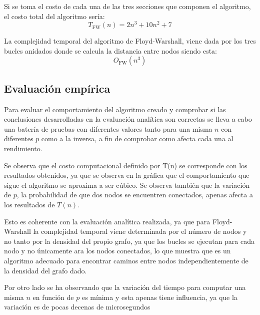Si se toma el costo de cada una de las tres secciones que componen el algoritmo, el costo total del algoritmo sería:
\begin{equation}
    T_{\mathrm{FW}}(n) = 2n^3 + 10n^2 + 7
\end{equation}

La complejidad temporal del algoritmo de Floyd-Warshall, viene dada por los tres bucles anidados donde se calcula la distancia entre nodos  siendo esta:
\begin{equation}
    O_{\mathrm{FW}}(n^3) 
\end{equation}

\subsection*{Evaluación empírica}

Para evaluar el comportamiento del algoritmo creado y comprobar si las conclusiones desarrolladas en la evaluación analítica son correctas se lleva a cabo una batería de pruebas con diferentes valores tanto para una misma $n$ con diferentes $p$ como a la inversa, a fin de comprobar como afecta cada una al rendimiento.


Se observa que el costo computacional definido por T(n) se corresponde con los resultados obtenidos, ya que se observa en la gráfica que el comportamiento que sigue el algoritmo se aproxima a ser cúbico. Se observa también que la variación de $p$, la probabilidad de que dos nodos se encuentren conectados, apenas  afecta a los resultados de $T(n)$.

Esto es coherente con la evaluación analítica realizada, ya que para Floyd-Warshall la complejidad temporal viene determinada por el número de nodos y no tanto por la densidad del propio grafo, ya que los bucles se ejecutan para cada nodo y no únicamente ara los nodos conectados, lo que muestra que es un algoritmo adecuado para encontrar caminos entre nodos independientemente de la densidad del grafo dado.

Por otro lado se ha observando que la variación del tiempo para computar una misma $n$ en función de $p$ es mínima y esta apenas tiene influencia, ya que la variación es de pocas decenas de microsegundos
